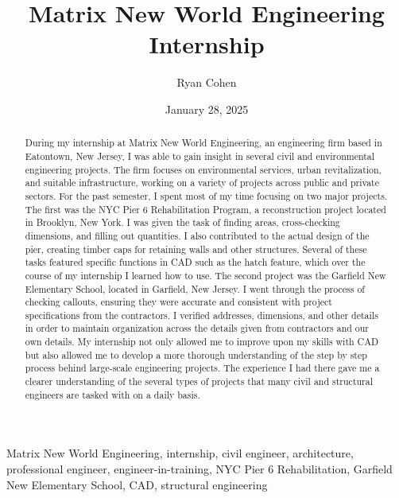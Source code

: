 \documentclass[12pt,conference,onecolumn]{IEEEtran}
\title{Matrix New World Engineering Internship}
\author{Ryan Cohen}
\date{January 28, 2025}
\newcommand{\keywords}{Matrix New World Engineering, internship, civil engineer, architecture, professional engineer, engineer-in-training, NYC Pier 6 Rehabilitation, Garfield New Elementary School, CAD, structural engineering}
\begin{document}
\maketitle 

\begin{abstract}
During my internship at Matrix New World Engineering, an engineering firm based in Eatontown, New Jersey, I was able to gain insight in several civil and environmental engineering projects. The firm focuses on environmental services, urban revitalization, and suitable infrastructure, working on a variety of projects across public and private sectors. For the past semester, I spent most of my time focusing on two major projects. The first was the NYC Pier 6 Rehabilitation Program, a reconstruction project located in Brooklyn, New York. I was given the task of finding areas, cross-checking dimensions, and filling out quantities. I also contributed to the actual design of the pier, creating timber caps for retaining walls and other structures. Several of these tasks featured specific functions in CAD such as the hatch feature, which over the course of my internship I learned how to use. The second project was the Garfield New Elementary School, located in Garfield, New Jersey. I went through the process of checking callouts, ensuring they were accurate and consistent with project specifications from the contractors. I verified addresses, dimensions, and other details in order to maintain organization across the details given from contractors and our own details. My internship not only allowed me to improve upon my skills with CAD but also allowed me to develop a more thorough understanding of the step by step process behind large-scale engineering projects. The experience I had there gave me a clearer understanding of the several types of projects that many civil and structural engineers are tasked with on a daily basis.
\end{abstract}

\begin{IEEEkeywords}
\keywords
\end{IEEEkeywords}
\end{document}
